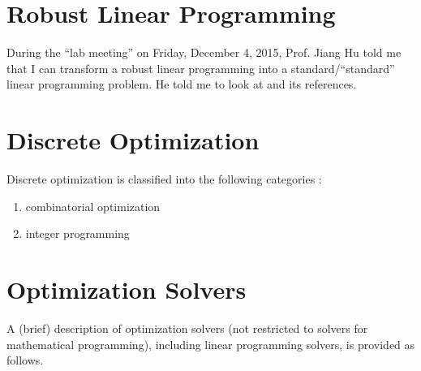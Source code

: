 \section{Robust Linear Programming}
\label{sec:RobustLinearProgramming}


During the ``lab meeting'' on Friday, December 4, 2015, Prof. Jiang Hu told me that I can transform a robust linear programming into a standard/``standard'' linear programming problem. He told me to look at \cite{Bertsimas2004} and its references.




\section{Discrete Optimization}
\label{sec:DiscreteOptimization}

Discrete optimization is classified into the following categories \cite{WikipediaContributors2015h,Hammer1979,Lee2004c}: \vspace{-0.3cm}
\begin{enumerate} \itemsep -4pt
\item combinatorial optimization
\item integer programming
\end{enumerate}








\section{Optimization Solvers}
\label{sec:OptimizationSolvers}

A (brief) description of optimization solvers (not restricted to solvers for mathematical programming), including linear programming solvers, is provided as follows. \\


